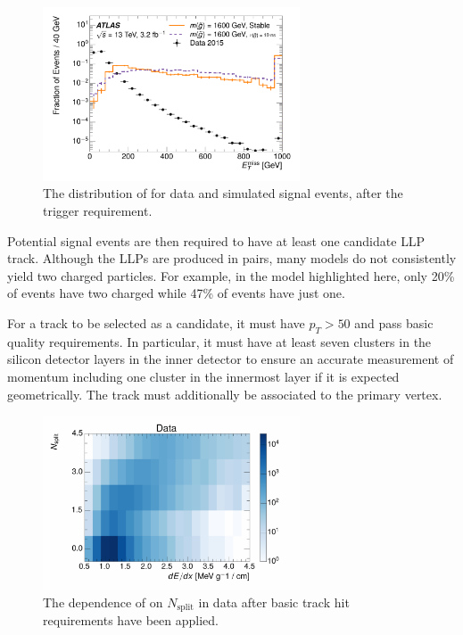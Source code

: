 \begin{figure}[h]
\centering
\includegraphics[width=0.68\textwidth]{figures/selection_met_nm1_log.pdf}
\caption{The distribution of \met for data and simulated signal events, after the trigger requirement.}
\label{fig:nm1_met}
\end{figure}

Potential signal events are then required to have at least one candidate \ac{LLP} track.
Although the \acp{LLP} are produced in pairs, many models do not consistently yield two charged particles.
For example, in the \rhadron model highlighted here, only 20\% of events have two charged \rhadrons while 47\% of events have just one.

For a track to be selected as a candidate, it must have $p_T > 50$ \GeV and pass basic quality requirements. 
In particular, it must have at least seven clusters in the silicon detector layers in the inner detector to ensure an accurate measurement of momentum including one cluster in the innermost layer if it is expected geometrically. 
The track must additionally be associated to the primary vertex.


\begin{figure}[h]
\centering
\includegraphics[width=0.68\textwidth]{figures/dedx_nsplit_data.pdf}
\caption{The dependence of \dedx on $N_{\mathrm{split}}$ in data after basic track hit requirements have been applied.}
\label{fig:dedx_nsplit}
\end{figure}

